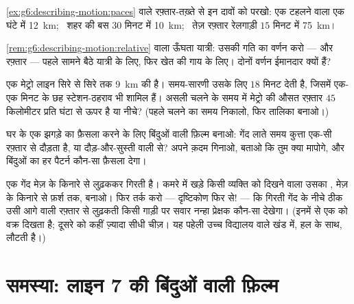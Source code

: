 \begin{exercise}[$\star$]\label{exo:g6:describing-motion:8}
\cref{ex:g6:describing-motion:paces} वाले रफ़्तार-तख़्ते से इन दावों
को परखो: एक टहलने वाला एक घंटे में \qty{12}{km}; \ शहर की बस $30$
मिनट में \qty{10}{km}; \ तेज़ रफ़्तार रेलगाड़ी $15$ मिनट में
\qty{75}{km}।
\end{exercise}

\begin{exercise}[$\star\star$]\label{exo:g6:describing-motion:9}
\cref{rem:g6:describing-motion:relative} वाला ऊँघता यात्री: उसकी
गति का वर्णन करो ---  और रफ़्तार --- पहले सामने बैठे यात्री के
लिए, फिर खेत की गाय के लिए। दोनों वर्णन ईमानदार क्यों हैं?
\end{exercise}

\begin{exercise}[$\star\star$]\label{exo:g6:describing-motion:10}
एक मेट्रो लाइन सिरे से सिरे तक \qty{9}{km} की है। समय-सारणी उसके लिए
$18$ मिनट देती है, जिसमें एक-एक मिनट के छह स्टेशन-ठहराव भी शामिल हैं।
असली चलने के समय में मेट्रो की औसत रफ़्तार $45$ किलोमीटर प्रति घंटा से
ऊपर है या नीचे? (पहले चलने का समय निकालो, फिर तालिका बनाओ।)
\end{exercise}

\begin{exercise}[$\star\star$]\label{exo:g6:describing-motion:11}
घर के एक झगड़े का फ़ैसला करने के लिए बिंदुओं वाली फ़िल्म बनाओ: गेंद
लाते समय कुत्ता एक-सी रफ़्तार से दौड़ता है, या दौड़-और-सुस्ती वाली
 से? अपने क़दम गिनाओ, बताओ कि तुम क्या मापोगे, और बिंदुओं का
हर पैटर्न कौन-सा फ़ैसला देगा।
\end{exercise}

\begin{exercise}[$\star\star\star$]\label{exo:g6:describing-motion:12}
एक गेंद मेज़ के किनारे से लुढ़ककर गिरती है। कमरे में खड़े किसी व्यक्ति
को दिखने वाला उसका , मेज़ के किनारे से फ़र्श तक, बनाओ। फिर तर्क
करो --- दृष्टिकोण फिर से! --- कि गिरती गेंद के नीचे ठीक उसी आगे वाली
रफ़्तार से लुढ़कती किसी गाड़ी पर सवार नन्हा प्रेक्षक कौन-सा 
देखेगा। (इनमें से एक को वक्र दिखता है; दूसरे को कहीं ज़्यादा सीधी
चीज़। यह पहेली उच्च विद्यालय वाले खंड में, हल के साथ, लौटती है।)
\end{exercise}

\section{समस्या: लाइन 7 की बिंदुओं वाली फ़िल्म}

